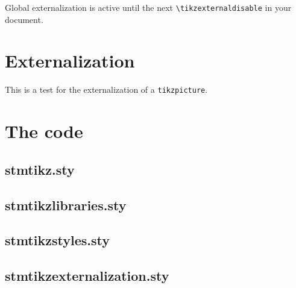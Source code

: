 \documentclass{scrartcl}
\begin{document}
Global externalization is active until the next \texttt{\textbackslash tikzexternaldisable} in your document.

\section{Externalization}

This is a test for the externalization of a \texttt{tikzpicture}.

\begin{figure}[htbp]
\centering
\tikzexternalenable
{}
\tikzexternaldisable
\end{figure}

\newpage
\appendix

\section{The code}

\subsection{stmtikz.sty}



\newpage
\subsection{stmtikzlibraries.sty}



\newpage
\subsection{stmtikzstyles.sty}



\newpage
\subsection{stmtikzexternalization.sty}


\end{document}
